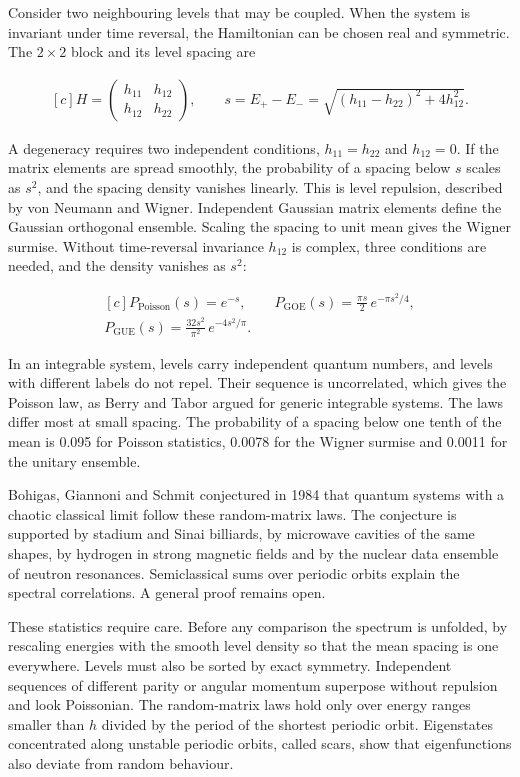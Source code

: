 \documentclass[11pt,oneside]{book}
\newenvironment{centeredalign}{\[\begin{gathered}[c]}{\end{gathered}\]}
\begin{document}
Consider two neighbouring levels that may be coupled. When the system is invariant under time reversal, the Hamiltonian can be chosen real and symmetric. The \(2\times2\) block and its level spacing are

\begin{centeredalign}
H=\begin{pmatrix}h_{11}&h_{12}\\h_{12}&h_{22}\end{pmatrix},\qquad
s=E_+-E_-=\sqrt{(h_{11}-h_{22})^2+4h_{12}^2}.
\end{centeredalign}

A degeneracy requires two independent conditions, \(h_{11}=h_{22}\) and \(h_{12}=0\). If the matrix elements are spread smoothly, the probability of a spacing below \(s\) scales as \(s^2\), and the spacing density vanishes linearly. This is level repulsion, described by von Neumann and Wigner. Independent Gaussian matrix elements define the Gaussian orthogonal ensemble. Scaling the spacing to unit mean gives the Wigner surmise. Without time-reversal invariance \(h_{12}\) is complex, three conditions are needed, and the density vanishes as \(s^2\):

\begin{centeredalign}
P_{\mathrm{Poisson}}(s)=e^{-s},\qquad
P_{\mathrm{GOE}}(s)=\frac{\pi s}{2}\,e^{-\pi s^2/4},\\
P_{\mathrm{GUE}}(s)=\frac{32s^2}{\pi^2}\,e^{-4s^2/\pi}.
\end{centeredalign}

In an integrable system, levels carry independent quantum numbers, and levels with different labels do not repel. Their sequence is uncorrelated, which gives the Poisson law, as Berry and Tabor argued for generic integrable systems. The laws differ most at small spacing. The probability of a spacing below one tenth of the mean is 0.095 for Poisson statistics, 0.0078 for the Wigner surmise and 0.0011 for the unitary ensemble.

Bohigas, Giannoni and Schmit conjectured in 1984 that quantum systems with a chaotic classical limit follow these random-matrix laws. The conjecture is supported by stadium and Sinai billiards, by microwave cavities of the same shapes, by hydrogen in strong magnetic fields and by the nuclear data ensemble of neutron resonances. Semiclassical sums over periodic orbits explain the spectral correlations. A general proof remains open.

These statistics require care. Before any comparison the spectrum is unfolded, by rescaling energies with the smooth level density so that the mean spacing is one everywhere. Levels must also be sorted by exact symmetry. Independent sequences of different parity or angular momentum superpose without repulsion and look Poissonian. The random-matrix laws hold only over energy ranges smaller than \(h\) divided by the period of the shortest periodic orbit. Eigenstates concentrated along unstable periodic orbits, called scars, show that eigenfunctions also deviate from random behaviour.
\end{document}
